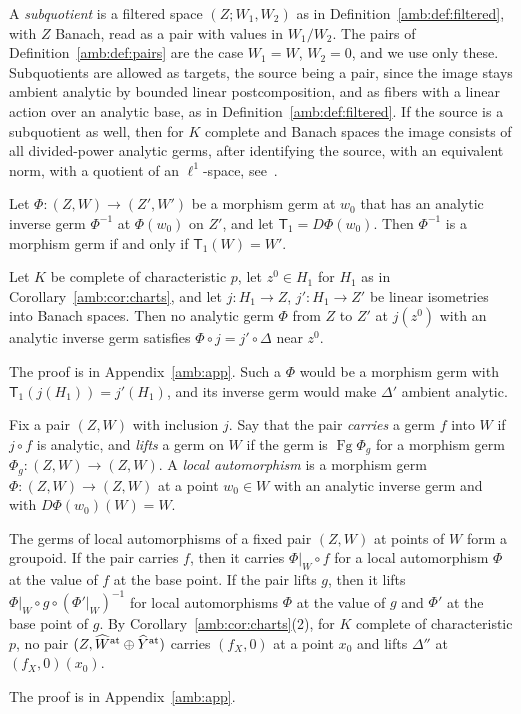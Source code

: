 A \emph{subquotient} is a filtered space $(Z;W_1,W_2)$ as in Definition~\ref{amb:def:filtered}, with $Z$ Banach, read as a pair with values in $W_1/W_2$. The pairs of Definition~\ref{amb:def:pairs} are the case $W_1=W$, $W_2=0$, and we use only these. Subquotients are allowed as targets, the source being a pair, since the image stays ambient analytic by bounded linear postcomposition, and as fibers with a linear action over an analytic base, as in Definition~\ref{amb:def:filtered}. If the source is a subquotient as well, then for $K$ complete and Banach spaces the image consists of all divided-power analytic germs, after identifying the source, with an equivalent norm, with a quotient of an $\ell^1$-space, see~\cite{II}.

\begin{theorem}\label{amb:thm:pair-inverse}
Let $\Phi\colon(Z,W)\to(Z',W')$ be a morphism germ at $w_0$ that has an analytic inverse germ $\Phi^{-1}$ at $\Phi(w_0)$ on $Z'$, and let $\mathsf T_1=D\Phi(w_0)$. Then $\Phi^{-1}$ is a morphism germ if and only if $\mathsf T_1(W)=W'$.

Let $K$ be complete of characteristic $p$, let $z^0\in H_1$ for $H_1$ as in Corollary~\ref{amb:cor:charts}, and let $j\colon H_1\to Z$, $j'\colon H_1\to Z'$ be linear isometries into Banach spaces. Then no analytic germ $\Phi$ from $Z$ to $Z'$ at $j(z^0)$ with an analytic inverse germ satisfies $\Phi\circ j=j'\circ\Delta$ near $z^0$.
\end{theorem}
The proof is in Appendix~\ref{amb:app}. Such a $\Phi$ would be a morphism germ with $\mathsf T_1(j(H_1))=j'(H_1)$, and its inverse germ would make $\Delta'$ ambient analytic.

Fix a pair $(Z,W)$ with inclusion $j$. Say that the pair \emph{carries} a germ $f$ into $W$ if $j\circ f$ is analytic, and \emph{lifts} a germ on $W$ if the germ is $\operatorname{Fg}\Phi_g$ for a morphism germ $\Phi_g\colon(Z,W)\to(Z,W)$. A \emph{local automorphism} is a morphism germ $\Phi\colon(Z,W)\to(Z,W)$ at a point $w_0\in W$ with an analytic inverse germ and with $D\Phi(w_0)(W)=W$.

\begin{corollary}\label{amb:cor:one-pair}
The germs of local automorphisms of a fixed pair $(Z,W)$ at points of $W$ form a groupoid. If the pair carries $f$, then it carries $\Phi|_W\circ f$ for a local automorphism $\Phi$ at the value of $f$ at the base point. If the pair lifts $g$, then it lifts $\Phi|_W\circ g\circ(\Phi'|_W)^{-1}$ for local automorphisms $\Phi$ at the value of $g$ and $\Phi'$ at the base point of $g$. By Corollary~\ref{amb:cor:charts}(2), for $K$ complete of characteristic $p$, no pair $(Z,\widehat W^{\rm at}\oplus\widehat Y^{\rm at})$ carries $(f_X,0)$ at a point $x_0$ and lifts $\Delta''$ at $(f_X,0)(x_0)$.
\end{corollary}
The proof is in Appendix~\ref{amb:app}.

